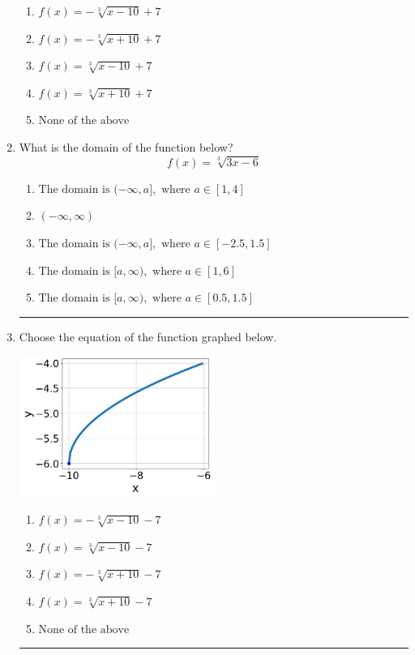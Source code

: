 \documentclass[14pt]{extbook}
\newcommand{\litem}[1]{\item#1\hspace*{-1cm}\rule{\textwidth}{0.4pt}}
\begin{document}
\begin{enumerate}
{\begin{center}
\end{center}
\begin{enumerate}[label=\Alph*.]
\item \( f(x) = - \sqrt[3]{x - 10} + 7 \)
\item \( f(x) = - \sqrt[3]{x + 10} + 7 \)
\item \( f(x) = \sqrt[3]{x - 10} + 7 \)
\item \( f(x) = \sqrt[3]{x + 10} + 7 \)
\item \( \text{None of the above} \)

\end{enumerate} }
\litem{
What is the domain of the function below?\[ f(x) = \sqrt[3]{3 x - 6} \]\begin{enumerate}[label=\Alph*.]
\item \( \text{The domain is } (-\infty, a], \text{   where } a \in [1, 4] \)
\item \( (-\infty, \infty) \)
\item \( \text{The domain is } (-\infty, a], \text{   where } a \in [-2.5, 1.5] \)
\item \( \text{The domain is } [a, \infty), \text{   where } a \in [1, 6] \)
\item \( \text{The domain is } [a, \infty), \text{   where } a \in [0.5, 1.5] \)

\end{enumerate} }
\litem{
Choose the equation of the function graphed below.
\begin{center}
    \includegraphics[width=0.5\textwidth]{../Figures/radicalGraphToEquationA.png}
\end{center}
\begin{enumerate}[label=\Alph*.]
\item \( f(x) = - \sqrt[3]{x - 10} - 7 \)
\item \( f(x) = \sqrt[3]{x - 10} - 7 \)
\item \( f(x) = - \sqrt[3]{x + 10} - 7 \)
\item \( f(x) = \sqrt[3]{x + 10} - 7 \)
\item \( \text{None of the above} \)


\end{enumerate}}
\end{enumerate}
\end{document}
